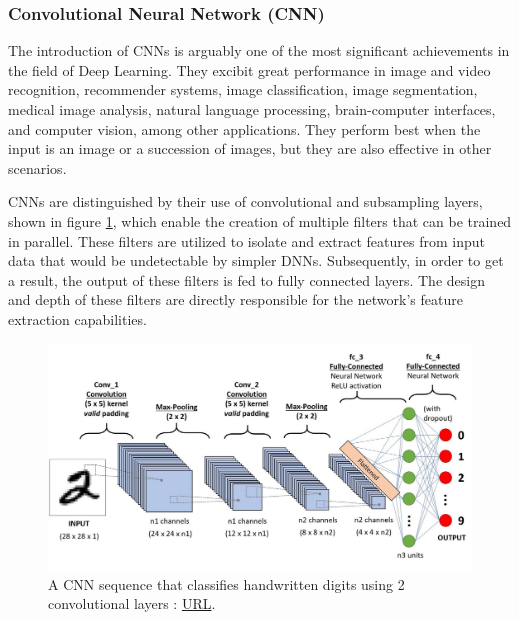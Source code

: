 \subsubsection{Convolutional Neural Network (CNN)}
The introduction of CNNs\cite{CS231n_stanford_cnn} is arguably one of the most significant achievements in the field of Deep Learning. They excibit great performance in image and video recognition, recommender systems, image classification, image segmentation, medical image analysis, natural language processing, brain-computer interfaces, and computer vision, among other applications. They perform best when the input is an image or a succession of images, but they are also effective in other scenarios.

CNNs are distinguished by their use of convolutional and subsampling layers, shown in figure \ref{fig:A CNN sequence to classify handwritten digits}, which enable the creation of multiple filters that can be trained in parallel. These filters are utilized to isolate and extract features from input data that would be undetectable by simpler DNNs. Subsequently, in order to get a result, the output of these filters is fed to fully connected layers. The design and depth of these filters are directly responsible for the network's feature extraction capabilities.

\begin{figure}[H]
    \centering
        \includegraphics[width=1\textwidth]{Images/ANNArchitectures/cnn_2conv_layers.jpg}
        \decoRule
        \caption[A CNN sequence to classify handwritten digits]{A CNN sequence that classifies handwritten digits using 2 convolutional layers \cite{comprehensive_cnn}: \href{https://towardsdatascience.com/a-comprehensive-guide-to-convolutional-neural-networks-the-eli5-way-3bd2b1164a53}{URL}.}
        \label{fig:A CNN sequence to classify handwritten digits}
\end{figure}

